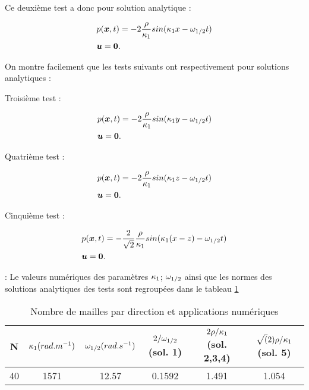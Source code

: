 Ce deuxième test a donc pour solution analytique : 

\begin{mdframed}
\begin{align*} 
&p(\bm{x},t) = - 2 \frac{\r}{\k_1} sin(\k_1 x - \o_{1/2} t)  \\
&\bm{u} = \bm{0}.   
\end{align*}
\end{mdframed}

On montre facilement que les tests suivants ont respectivement pour solutions analytiques : 

Troisième test : 
\begin{mdframed}
\begin{align*} 
&p(\bm{x},t) = - 2 \frac{\r}{\k_1} sin(\k_1 y - \o_{1/2} t)  \\
&\bm{u} = \bm{0}.   
\end{align*}
\end{mdframed}

Quatrième test : 
\begin{mdframed}
\begin{align*} 
&p(\bm{x},t) = - 2 \frac{\r}{\k_1} sin(\k_1 z - \o_{1/2} t)  \\
&\bm{u} = \bm{0}.   
\end{align*}
\end{mdframed}

Cinquième test : 
\begin{mdframed}
\begin{align*} 
&p(\bm{x},t) = - \frac{2}{\sqrt{2}} \frac{\r}{\k_1} sin(\k_1 (x-z) - \o_{1/2} t) \\
&\bm{u} = \bm{0}.   
\end{align*}
\end{mdframed}

 : Le valeurs numériques des paramètres $\k_1$; $\o_{1/2}$ ainsi que les normes des solutions analytiques des tests sont regroupées dans le tableau \ref{tab : AN}

\begin{table}[h]
\begin{center}
\begin{tabular}{c|c|c|c|c|c}
 N  & $\k_1(rad.m^{-1})$        & $\o_{1/2}(rad.s^{-1})$ & $2/ \o_{1/2}$ (sol. 1) & $2 \r / \k_1$ (sol. 2,3,4) & $\sqrt(2) \r / \k_1$ (sol. 5)  \\ \hline
 40 & 1571                      &   12.57                & 0.1592                &   1.491                    & 1.054
\end{tabular}
\end{center}
\caption{Nombre de mailles par direction et applications numériques}
\label{tab : AN}
\end{table}


